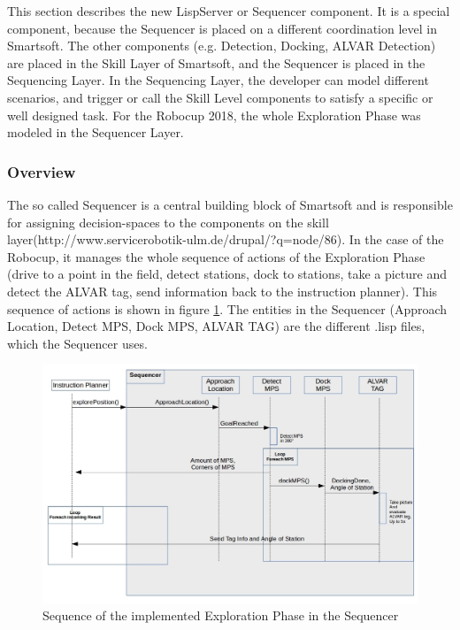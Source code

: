 This section describes the new LispServer or Sequencer component. It is a special component, because the Sequencer is placed on a different coordination level in Smartsoft. The other components (e.g. Detection, Docking, ALVAR Detection) are placed in the Skill Layer of Smartsoft, and the Sequencer is placed in the Sequencing Layer. In the Sequencing Layer, the developer can model different scenarios, and trigger or call the Skill Level components to satisfy a specific or well designed task. 
For the Robocup 2018, the whole Exploration Phase was modeled in the Sequencer Layer.

\subsubsection{Overview}
\label{sec:sequencer_overview}
The so called Sequencer is a central building block of Smartsoft and is responsible for assigning decision-spaces to the components on the skill layer(http://www.servicerobotik-ulm.de/drupal/?q=node/86). In the case of the Robocup, it manages the whole sequence of actions of the Exploration Phase (drive to a point in the field, detect stations, dock to stations, take a picture and detect the ALVAR tag, send information back to the instruction planner). This sequence of actions is shown in figure \ref{fig:sequ_overview}.
The entities in the Sequencer (Approach Location, Detect MPS, Dock MPS, ALVAR TAG) are the different .lisp files, which the Sequencer uses.

\begin{figure}[h]
\centering
\includegraphics[scale=0.5]{pic/sequenceSequencer.JPG}
\caption{Sequence of the implemented Exploration Phase in the Sequencer}
\label{fig:sequ_overview}
\end{figure}


